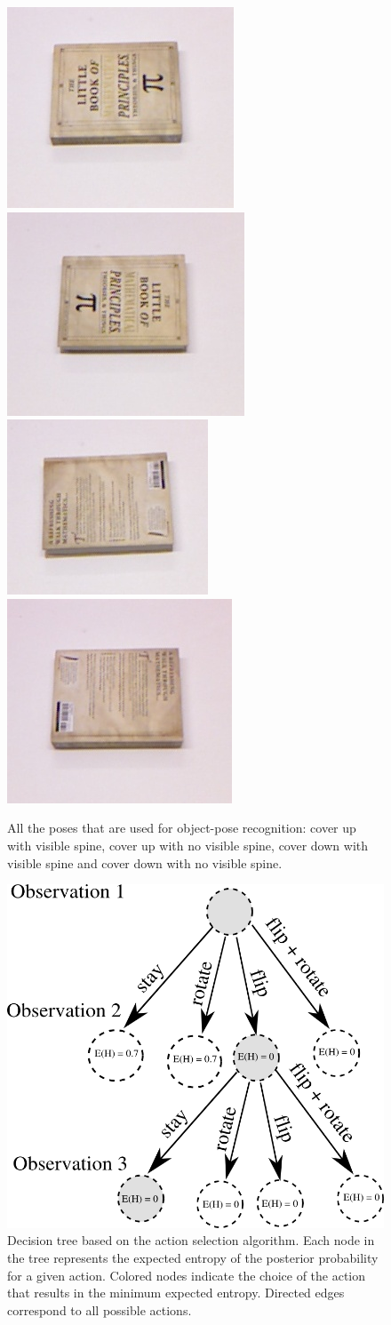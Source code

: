     
     \begin{figure}
     \centering
    		\includegraphics[width = 0.2\columnwidth]{pics/math_cover1.jpg}
    		\includegraphics[width = 0.2\columnwidth]{pics/math_cover1_rot.jpg}
    		\includegraphics[width = 0.2\columnwidth]{pics/math_down.jpg}
    		\includegraphics[width = 0.2\columnwidth]{pics/math_down_rot.jpg}
    		\caption{All the poses that are used for object-pose recognition: cover up with visible spine, cover up with no visible spine, cover down with visible spine and cover down with no visible spine.}
	\label{fig:pose_dataset}
    \end{figure}   
        
        
    \begin{figure}
    \centering
    		\includegraphics[width = 0.7\columnwidth]{pics/tree_small.png}
    	\caption{Decision tree based on the action selection algorithm. Each node in the tree represents the expected entropy of the posterior probability for a given action. Colored nodes indicate the choice of the action that results in the minimum expected entropy. Directed edges correspond to all possible actions.  }
    	    	\label{fig:tree}
    \end{figure}
    
